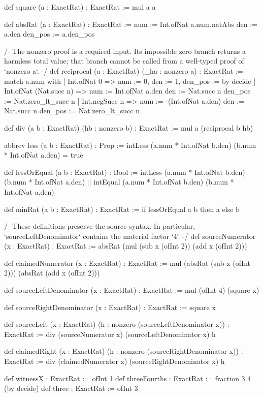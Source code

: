 \documentclass[11pt]{article}
\begin{document}
\begin{Vlean}
def square (a : ExactRat) : ExactRat :=
  mul a a

def absRat (a : ExactRat) : ExactRat :=
  { num := Int.ofNat a.num.natAbs
    den := a.den
    den_pos := a.den_pos }

/- The nonzero proof is a required input. Its impossible zero branch returns
a harmless total value; that branch cannot be called from a well-typed proof
of `nonzero a`. -/
def reciprocal (a : ExactRat) (_ha : nonzero a) : ExactRat :=
  match a.num with
  | Int.ofNat 0 =>
      { num := 0, den := 1, den_pos := by decide }
  | Int.ofNat (Nat.succ n) =>
      { num := Int.ofNat a.den
        den := Nat.succ n
        den_pos := Nat.zero_lt_succ n }
  | Int.negSucc n =>
      { num := -(Int.ofNat a.den)
        den := Nat.succ n
        den_pos := Nat.zero_lt_succ n }

def div (a b : ExactRat) (hb : nonzero b) : ExactRat :=
  mul a (reciprocal b hb)

abbrev less (a b : ExactRat) : Prop :=
  intLess (a.num * Int.ofNat b.den) (b.num * Int.ofNat a.den) = true

def lessOrEqual (a b : ExactRat) : Bool :=
  intLess (a.num * Int.ofNat b.den) (b.num * Int.ofNat a.den) ||
    intEqual (a.num * Int.ofNat b.den) (b.num * Int.ofNat a.den)

def minRat (a b : ExactRat) : ExactRat :=
  if lessOrEqual a b then a else b

/- These definitions preserve the source syntax. In particular,
`sourceLeftDenominator` contains the material factor `4`. -/
def sourceNumerator (x : ExactRat) : ExactRat :=
  absRat (mul (sub x (ofInt 2)) (add x (ofInt 2)))

def claimedNumerator (x : ExactRat) : ExactRat :=
  mul (absRat (sub x (ofInt 2))) (absRat (add x (ofInt 2)))

def sourceLeftDenominator (x : ExactRat) : ExactRat :=
  mul (ofInt 4) (square x)

def sourceRightDenominator (x : ExactRat) : ExactRat :=
  square x

def sourceLeft (x : ExactRat) (h : nonzero (sourceLeftDenominator x)) :
    ExactRat :=
  div (sourceNumerator x) (sourceLeftDenominator x) h

def claimedRight (x : ExactRat) (h : nonzero (sourceRightDenominator x)) :
    ExactRat :=
  div (claimedNumerator x) (sourceRightDenominator x) h

def witnessX : ExactRat := ofInt 1
def threeFourths : ExactRat := fraction 3 4 (by decide)
def three : ExactRat := ofInt 3


\end{Vlean}
\end{document}
